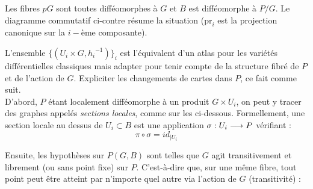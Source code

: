 \begin{definition}
\begin{adjustbox}{valign=C,raise=1cm, minipage={1.1\linewidth}}
		Les fibres $pG$ sont toutes difféomorphes à $G$ et $B$ est difféomorphe à $P/G$. Le diagramme commutatif ci-contre résume la situation ($\text{pr}_i$ est la projection canonique sur la $i-$ème composante).
	\end{adjustbox}
\end{definition}
\skipl 


L'ensemble $\big\{(U_i\times G, {h_i}^{-1})\big\}_i$ est l'équivalent d'un atlas pour les variétés différentielles classiques mais adapter pour tenir compte de la structure fibré de $P$ et de l'action de $G$. Expliciter les changements de cartes dans $P$, ce fait comme suit.
\\
D'abord, $P$ étant localement difféomorphe à un produit $G\times U_i$, on peut y tracer des graphes appelés \emph{sections locales}, comme sur les  ci-dessous. Formellement, une section locale au dessus  de $U_i \subset B$ est une application $\sigma : U_i \longrightarrow P$ vérifiant :
\[\pi\circ \sigma = id_{{\displaystyle |}U_i}\]
\begin{figure}[H]
	\begin{floatrow}
		
	\end{floatrow}
\end{figure}
\noindent
Ensuite, les hypothèses sur $P(G,B)$ sont telles que $G$ agit transitivement et librement (ou sans point fixe) sur $P$. C'est-à-dire que, sur une même fibre, tout point peut être atteint par n'importe quel autre via l'action de $G$ (transitivité) :
